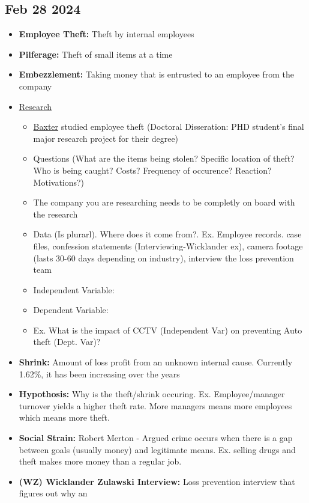 \documentclass[12pt]{article}
\begin{document}
\subsection*{Feb 28 2024}

\begin{itemize}
		  \item \textbf{Employee Theft:}  Theft by internal employees
		  \item \textbf{Pilferage:} Theft of small items at a time  
		  \item \textbf{Embezzlement:} Taking money that is entrusted to an employee from the company  
		  \item \underline{Research}
		 		\begin{itemize}
					\item \underline{Baxter} studied employee theft (Doctoral Disseration: PHD student's final
						major research project for their degree) 
					\item Questions (What are the items being stolen? Specific location of theft? 
						Who is being caught? Costs? Frequency of occurence? Reaction? Motivations?)
					\item The company you are researching needs to be completly on board with the research
					\item Data (Is plurarl). Where does it come from?. Ex. Employee records. case files, 
						confession statements (Interviewing-Wicklander ex), camera footage (lasts 30-60 days
						depending on industry), interview the loss prevention team
		  			\item Independent Variable: 
		  			\item Dependent Variable:
		  			\item Ex. What is the impact of CCTV (Independent Var) on preventing Auto theft (Dept. Var)?
			  	\end{itemize}	
		  \item \textbf{Shrink:} Amount of loss profit from an unknown internal cause. Currently 1.62\%, it 
		 		has been increasing over the years 
		  \item \textbf{Hypothosis:} Why is the theft/shrink occuring. Ex. Employee/manager turnover yields
		  		a higher theft rate. More managers means more employees which means more theft. 
		  \item \textbf{Social Strain:} Robert Merton - Argued crime occurs when there is a gap between
				goals (usually money) and legitimate means. Ex. selling drugs and theft makes more money than
				a regular job. 
		  \item \textbf{(WZ) Wicklander Zulawski Interview:} Loss prevention interview that figures out why an

\end{itemize}
\end{document}
